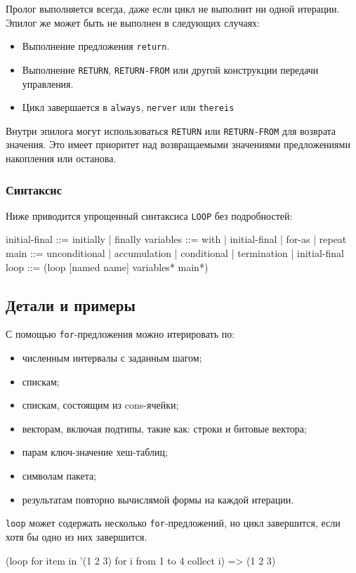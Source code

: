 Пролог выполняется всегда, даже если цикл не выполнит ни одной итерации. Эпилог же может быть не выполнен в следующих случаях:
\begin{itemize}
  \item Выполнение предложения \lstinline{return}.
  \item Выполнение \lstinline{RETURN}, \lstinline{RETURN-FROM} или другой конструкции передачи управления.
  \item Цикл завершается в \lstinline{always}, \lstinline{nerver} или \lstinline{thereis}
\end{itemize}

Внутри эпилога могут использоваться \lstinline{RETURN} или \lstinline{RETURN-FROM} для возврата значения. Это имеет приоритет над возвращаемыми значениями предложениями накопления или останова.


\subsubsection{Синтаксис}
Ниже приводится упрощенный синтаксиса \lstinline{LOOP} без подробностей:
\begin{plainlst}{}{}
initial-final ::= initially | finally
variables ::= with | initial-final | for-as | repeat
main ::= unconditional | accumulation | conditional
       | termination | initial-final
loop ::= (loop [named name] {variables}* {main}*)
\end{plainlst}

\subsection{Детали и примеры}
С помощью \lstinline{for}-предложения можно итерировать по:
\begin{itemize}
  \item численным интервалы с заданным шагом;
  \item спискам;
  \item спискам, состоящим из cons-ячейки;
  \item векторам, включая подтипы, такие как: строки и битовые вектора;
  \item парам ключ-значение хеш-таблиц;
  \item символам пакета;
  \item результатам повторно вычислямой формы на каждой итерации.
\end{itemize}

\lstinline{loop} может содержать несколько \lstinline{for}-предложений, но цикл завершится, если хотя бы одно из них завершится.
\begin{cllst}{}{}
(loop
   for item in '(1 2 3)
   for i from 1 to 4
   collect i)            => (1 2 3)
\end{cllst}

